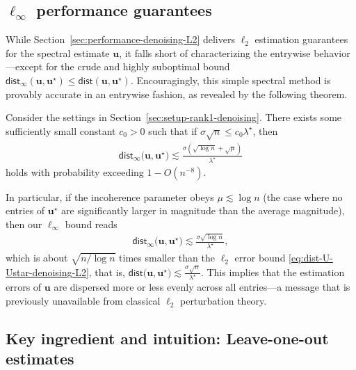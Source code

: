 \subsection{$\ell_{\infty}$ performance guarantees}



While Section~\ref{sec:performance-denoising-L2} delivers $\ell_2$ estimation guarantees for the spectral estimate $\bm{u}$,
it falls short of characterizing the entrywise behavior---except for the crude and highly suboptimal bound  $\mathsf{dist}_{\infty}(\bm{u},\bm{u}^{\star})\leq \mathsf{dist}(\bm{u},\bm{u}^{\star})$. Encouragingly,  this simple spectral method is provably  accurate in an entrywise fashion, as revealed by the following theorem.
%
 \begin{theorem}
	 Consider the settings in Section~\ref{sec:setup-rank1-denoising}.
	 There exists some sufficiently small constant $c_0>0$ such that if $\sigma \sqrt{n} \leq c_0 \lambda^{\star}$, then
 \begin{align}
	 \mathsf{dist}_{\infty}\big(\bm{u},\bm{u}^{\star}\big)
	 \lesssim \frac{\sigma (\sqrt{\log n} + \sqrt{\mu} )}{\lambda^{\star}}
 \end{align}
	 holds with probability exceeding $1-O(n^{-8})$.
  \end{theorem}
%

In particular, if the incoherence parameter obeys $\mu \lesssim \log n$ (the case where no entries of $\bm{u}^{\star}$ are significantly larger in magnitude than the average magnitude), then our $\ell_{\infty}$ bound reads
%
\begin{align}
	 \mathsf{dist}_{\infty}\big(\bm{u},\bm{u}^{\star}\big)
	 \lesssim \frac{\sigma\sqrt{\log n}}{\lambda^{\star}} ,
 \end{align}
%
which is about $\sqrt{n/\log n}$ times smaller than the $\ell_2$ error bound \eqref{eq:dist-U-Ustar-denoising-L2}, that is, $\mathsf{dist}\big(\bm{u},\bm{u}^{\star}\big)   \lesssim \frac{\sigma\sqrt{ n}}{\lambda^{\star}}$.
This implies that the estimation errors of $\bm{u}$ are dispersed  more or less evenly across all entries---a message that is previously unavailable from classical $\ell_2$ perturbation theory.




\subsection{Key ingredient and intuition: Leave-one-out estimates}
\label{sec:LOO-estimates-denoising}

